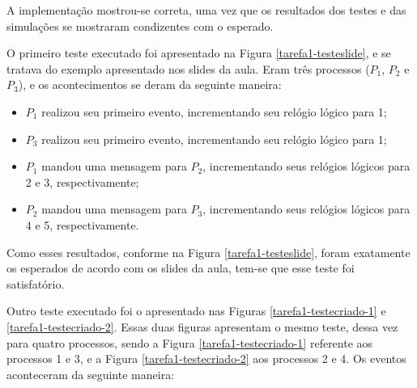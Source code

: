 \documentclass[conference]{IEEEtran}
\begin{document}
	A implementação mostrou-se correta, uma vez que os resultados dos testes e das simulações se mostraram condizentes com o esperado.
	
	O primeiro teste executado foi apresentado na Figura \ref{tarefa1-testeslide}, e se tratava do exemplo apresentado nos slides da aula. Eram três processos ($P_1$, $P_2$ e $P_3$), e os acontecimentos se deram da seguinte maneira:
	
\begin{itemize}
\item $P_1$ realizou seu primeiro evento, incrementando seu relógio lógico para 1;
\item $P_3$ realizou seu primeiro evento, incrementando seu relógio lógico para 1;
\item $P_1$ mandou uma mensagem para $P_2$, incrementando seus relógios lógicos para 2 e 3, respectivamente;
\item $P_2$ mandou uma mensagem para $P_3$, incrementando seus relógios lógicos para 4 e 5, respectivamente.
\end{itemize}

	Como esses resultados, conforme na Figura \ref{tarefa1-testeslide}, foram exatamente os esperados de acordo com os slides da aula, tem-se que esse teste foi satisfatório.
	
	
	Outro teste executado foi o apresentado nas Figuras \ref{tarefa1-testecriado-1} e \ref{tarefa1-testecriado-2}. Essas duas figuras apresentam o mesmo teste, dessa vez para quatro processos, sendo a Figura \ref{tarefa1-testecriado-1} referente aos processos 1 e 3, e a Figura \ref{tarefa1-testecriado-2} aos processos 2 e 4. Os eventos aconteceram da seguinte maneira:
	
\end{document}

